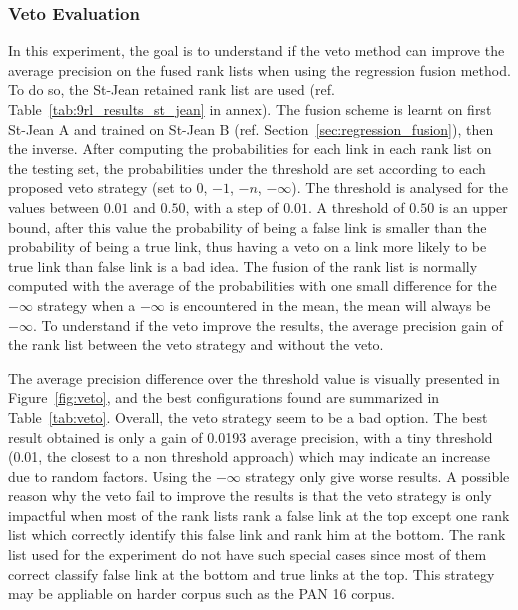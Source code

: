 \subsubsection{Veto Evaluation}

In this experiment, the goal is to understand if the veto method can improve the average precision on the fused rank lists when using the regression fusion method.
To do so, the St-Jean retained rank list are used (ref. Table~\ref{tab:9rl_results_st_jean} in annex).
The fusion scheme is learnt on first St-Jean A and trained on St-Jean B (ref. Section~\ref{sec:regression_fusion}), then the inverse.
After computing the probabilities for each link in each rank list on the testing set, the probabilities under the threshold are set according to each proposed veto strategy (set to $0$, $-1$, $-n$, $-\infty$).
The threshold is analysed for the values between $0.01$ and $0.50$, with a step of $0.01$.
A threshold of $0.50$ is an upper bound, after this value the probability of being a false link is smaller than the probability of being a true link, thus having a veto on a link more likely to be true link than false link is a bad idea.
The fusion of the rank list is normally computed with the average of the probabilities with one small difference for the $-\infty$ strategy when a $-\infty$ is encountered in the mean, the mean will always be $-\infty$.
To understand if the veto improve the results, the average precision gain of the rank list between the veto strategy and without the veto.

The average precision difference over the threshold value is visually presented in Figure~\ref{fig:veto}, and the best configurations found are summarized in Table~\ref{tab:veto}.
Overall, the veto strategy seem to be a bad option.
The best result obtained is only a gain of 0.0193 average precision, with a tiny threshold (0.01, the closest to a non threshold approach) which may indicate an increase due to random factors.
Using the $-\infty$ strategy only give worse results.
A possible reason why the veto fail to improve the results is that the veto strategy is only impactful when most of the rank lists rank a false link at the top except one rank list which correctly identify this false link and rank him at the bottom.
The rank list used for the experiment do not have such special cases since most of them correct classify false link at the bottom and true links at the top.
This strategy may be appliable on harder corpus such as the PAN 16 corpus.

